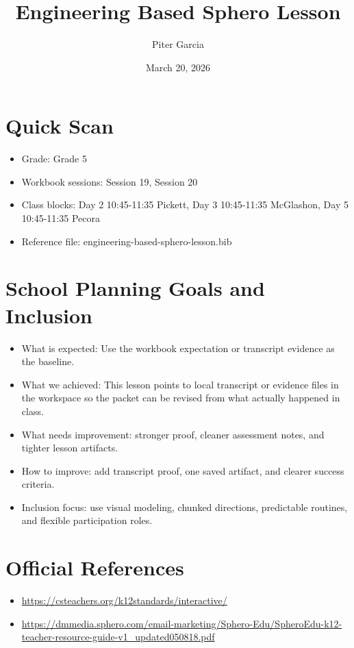 \documentclass[11pt]{article}
\title{Engineering Based Sphero Lesson}
\author{Piter Garcia}
\date{March 20, 2026}
\begin{document}
    \maketitle
    \section*{Quick Scan}
    \begin{itemize}[leftmargin=*]
    \item Grade: Grade 5
    \item Workbook sessions: Session 19, Session 20
    \item Class blocks: Day 2 10:45-11:35 Pickett, Day 3 10:45-11:35 McGlashon, Day 5 10:45-11:35 Pecora
    \item Reference file: engineering-based-sphero-lesson.bib
    \end{itemize}
    \section*{School Planning Goals and Inclusion}
    \begin{itemize}[leftmargin=*]
    \item What is expected: Use the workbook expectation or transcript evidence as the baseline.
    \item What we achieved: This lesson points to local transcript or evidence files in the workspace so the packet can be revised from what actually happened in class.
    \item What needs improvement: stronger proof, cleaner assessment notes, and tighter lesson artifacts.
    \item How to improve: add transcript proof, one saved artifact, and clearer success criteria.
    \item Inclusion focus: use visual modeling, chunked directions, predictable routines, and flexible participation roles.
    \end{itemize}
    \section*{Official References}
    \begin{itemize}[leftmargin=*]
    \item \url{https://csteachers.org/k12standards/interactive/}
\item \url{https://dmmedia.sphero.com/email-marketing/Sphero-Edu/SpheroEdu-k12-teacher-resource-guide-v1_updated050818.pdf}

    \end{itemize}
    
\end{document}
